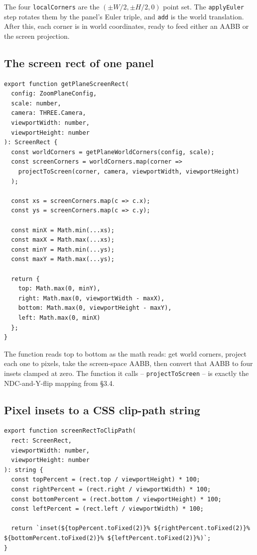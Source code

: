 \documentclass{article}
\begin{document}
The four \texttt{localCorners} are the $(\pm W/2, \pm H/2, 0)$ point set. The
\texttt{applyEuler} step rotates them by the panel's Euler triple, and \texttt{add} is
the world translation. After this, each corner is in world coordinates, ready to feed
either an AABB or the screen projection.

\subsection{The screen rect of one panel}

\begin{lstlisting}
export function getPlaneScreenRect(
  config: ZoomPlaneConfig,
  scale: number,
  camera: THREE.Camera,
  viewportWidth: number,
  viewportHeight: number
): ScreenRect {
  const worldCorners = getPlaneWorldCorners(config, scale);
  const screenCorners = worldCorners.map(corner =>
    projectToScreen(corner, camera, viewportWidth, viewportHeight)
  );

  const xs = screenCorners.map(c => c.x);
  const ys = screenCorners.map(c => c.y);

  const minX = Math.min(...xs);
  const maxX = Math.max(...xs);
  const minY = Math.min(...ys);
  const maxY = Math.max(...ys);

  return {
    top: Math.max(0, minY),
    right: Math.max(0, viewportWidth - maxX),
    bottom: Math.max(0, viewportHeight - maxY),
    left: Math.max(0, minX)
  };
}
\end{lstlisting}

The function reads top to bottom as the math reads: get world corners, project each one
to pixels, take the screen-space AABB, then convert that AABB to four insets clamped at
zero. The function it calls -- \texttt{projectToScreen} -- is exactly the
NDC-and-Y-flip mapping from \S 3.4.

\subsection{Pixel insets to a CSS clip-path string}

\begin{lstlisting}
export function screenRectToClipPath(
  rect: ScreenRect,
  viewportWidth: number,
  viewportHeight: number
): string {
  const topPercent = (rect.top / viewportHeight) * 100;
  const rightPercent = (rect.right / viewportWidth) * 100;
  const bottomPercent = (rect.bottom / viewportHeight) * 100;
  const leftPercent = (rect.left / viewportWidth) * 100;

  return `inset(${topPercent.toFixed(2)}% ${rightPercent.toFixed(2)}% ${bottomPercent.toFixed(2)}% ${leftPercent.toFixed(2)}%)`;
}
\end{lstlisting}
\end{document}
